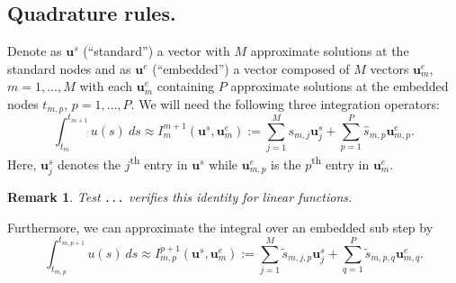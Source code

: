 \documentclass{article}
\newtheorem{remark}{Remark}
\newcommand{\ve}[1]{\mathbf{#1}}
\begin{document}
\subsection*{Quadrature rules.}
Denote as $\ve{u}^{s}$ (``standard'') a vector with $M$ approximate solutions at the standard nodes and as $\ve{u}^{e}$ (``embedded'') a vector composed of $M$ vectors $\ve{u}^{e}_{m}$, $m=1,\ldots,M$ with each $\ve{u}^{e}_{m}$ containing $P$ approximate solutions at the embedded nodes $t_{m,p}$, $p=1, \ldots, P$.
We will need the following three integration operators:
\begin{equation}
	\int_{t_{m}}^{t_{m+1}} u(s)~ds \approx I_{m}^{m+1}(\ve{u}^s, \ve{u}^{e}_{m}) := \sum_{j=1}^{M} s_{m,j} \ve{u}^{s}_{j} + \sum_{p=1}^{P} \hat{s}_{m,p} \ve{u}^{e}_{m,p}.
\end{equation}
Here, $\ve{u}^{s}_{j}$ denotes the $j$\textsuperscript{th} entry in $\ve{u}^{s}$ while $\ve{u}^{e}_{m,p}$ is the $p$\textsuperscript{th} entry in $\ve{u}^{e}_{m}$.
\begin{remark}
Test \texttt{...} verifies this identity for linear functions.
\end{remark}
Furthermore, we can approximate the integral over an embedded sub step by
\begin{equation}
	\int_{t_{m,p}}^{t_{m,p+1}} u(s)~ds \approx I_{m,p}^{p+1}(\ve{u}^s, \ve{u}^{e}_{m}) := \sum_{j=1}^{M} \tilde{s}_{m,j,p} \ve{u}^{s}_{j} + \sum_{q=1}^{P} \tilde{s}_{m,p,q} \ve{u}^{e}_{m,q}.
\end{equation}
\end{document}
